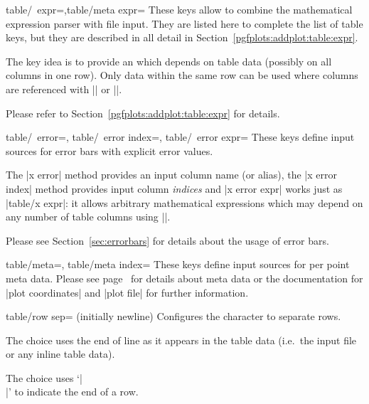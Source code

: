 {\begin{pgfplotsxykeylist}{table/\x\ expr=,table/meta expr=}
	These keys allow to combine the mathematical expression parser with file input. They are listed here to complete the list of table keys, but they are described in all detail in Section~\ref{pgfplots:addplot:table:expr}.

	The key idea is to provide an  which depends on table data (possibly on all columns in one row). Only data within the same row can be used where columns are referenced with |\thisrow| or |\thisrowno|. 
	
	Please refer to Section~\ref{pgfplots:addplot:table:expr} for details.
\end{pgfplotsxykeylist}


\begin{pgfplotsxykeylist}{%
	table/\x\ error=,
	table/\x\ error index=,
	table/\x\ error expr=}
	These keys define input sources for error bars with explicit error values. 
	
	The |x error| method provides an input column name (or alias), the |x error index| method provides input column \emph{indices} and |x error expr| works just as |table/x expr|: it allows arbitrary mathematical expressions which may depend on any number of table columns using |\thisrow|.

	Please see Section~\ref{sec:errorbars} for details about the usage of error bars.
\end{pgfplotsxykeylist}
\begin{pgfplotsxykeylist}{%
	table/meta=,
	table/meta index=}
	These keys define input sources for per point meta data. Please see page~\pageref{pgfplots:scatter:src} for details about meta data or the documentation for |plot coordinates| and |plot file| for further information.
\end{pgfplotsxykeylist}


\begin{pgfplotskey}{table/row sep= (initially newline)}
	Configures the character to separate rows.

	The choice  uses the end of line as it appears in the table data (i.e.\ the input file or any inline table data).

	The choice \declaretext{\string\\} uses `|\\|' to indicate the end of a row.


\end{pgfplotskey}}
